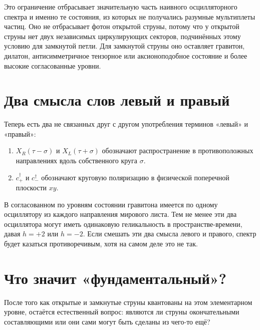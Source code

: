 Это ограничение отбрасывает значительную часть наивного осцилляторного спектра и именно те состояния, из которых не получались разумные мультиплеты частиц. Оно не отбрасывает фотон открытой струны, потому что у открытой струны нет двух независимых циркулирующих секторов, подчинённых этому условию для замкнутой петли. Для замкнутой струны оно оставляет гравитон, дилатон, антисимметричное тензорное или аксионоподобное состояние и более высокие согласованные уровни.

\section{Два смысла слов левый и правый}

Теперь есть два не связанных друг с другом употребления терминов «левый» и «правый»:
\begin{enumerate}
  \item \(X_R(\tau-\sigma)\) и \(X_L(\tau+\sigma)\) обозначают распространение
  в противоположных направлениях вдоль собственного круга \(\sigma\).
  \item \(c_+^\dagger\) и \(c_-^\dagger\) обозначают круговую поляризацию в
  физической поперечной плоскости \(xy\).
\end{enumerate}
В согласованном по уровням состоянии гравитона имеется по одному осциллятору из каждого направления мирового листа. Тем не менее эти два осциллятора могут иметь одинаковую геликальность в пространстве-времени, давая \(h=+2\) или \(h=-2\). Если смешать эти два смысла левого и правого, спектр будет казаться противоречивым, хотя на самом деле это не так.

\section{Что значит «фундаментальный»?}

После того как открытые и замкнутые струны квантованы на этом элементарном уровне, остаётся естественный вопрос: являются ли струны окончательными составляющими или они сами могут быть сделаны из чего-то ещё?

\begin{classroomqa}
\end{classroomqa}

